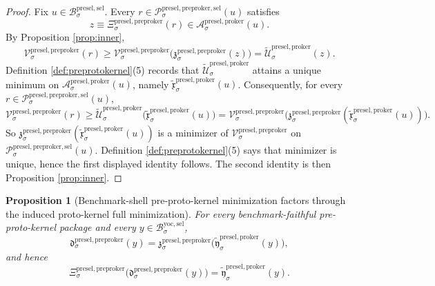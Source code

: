 \documentclass[11pt]{article}
\newcommand{\YoctoSelectorBody}[1]{\mathcal B_{#1}^{\mathrm{yoc,sel}}}
\newcommand{\PreSectionSelectorBody}[1]{\mathcal B_{#1}^{\mathrm{presel,sel}}}
\newcommand{\ProtoKernelSelectorFiber}[2]{\mathcal A_{#1}^{\mathrm{presel,proker}}(#2)}
\newcommand{\PreProtoKernelProj}[1]{\Xi_{#1}^{\mathrm{presel,preproker}}}
\newcommand{\PreProtoKernelFunctional}[1]{\mathscr V_{#1}^{\mathrm{presel,preproker}}}
\newcommand{\PreProtoKernelMinLift}[1]{\mathfrak z_{#1}^{\mathrm{presel,preproker}}}
\newcommand{\PreProtoKernelSelectorFiber}[2]{\mathcal P_{#1}^{\mathrm{presel,preproker,sel}}(#2)}
\newcommand{\PreProtoKernelFullMin}[1]{\mathfrak d_{#1}^{\mathrm{presel,preproker}}}
\newcommand{\InducedProtoKernelFunctional}[1]{\widetilde{\mathscr U}_{#1}^{\mathrm{presel,proker}}}
\newcommand{\InducedProtoKernelSelectorMin}[1]{\widetilde{\mathfrak x}_{#1}^{\mathrm{presel,proker}}}
\newcommand{\InducedProtoKernelFullMin}[1]{\widetilde{\mathfrak y}_{#1}^{\mathrm{presel,proker}}}
\newtheorem{proposition}{Proposition}
\begin{document}
\begin{proof}
Fix \(u\in\PreSectionSelectorBody{\sigma}\). Every \(r\in\PreProtoKernelSelectorFiber{\sigma}{u}\) satisfies
\[
z\equiv\PreProtoKernelProj{\sigma}(r)\in\ProtoKernelSelectorFiber{\sigma}{u}.
\]
By Proposition \ref{prop:inner},
\[
\PreProtoKernelFunctional{\sigma}(r)
\geq
\PreProtoKernelFunctional{\sigma}\bigl(\PreProtoKernelMinLift{\sigma}(z)\bigr)
=
\InducedProtoKernelFunctional{\sigma}(z).
\]
Definition \ref{def:preprotokernel}(5) records that \(\InducedProtoKernelFunctional{\sigma}\) attains a unique minimum on \(\ProtoKernelSelectorFiber{\sigma}{u}\), namely \(\InducedProtoKernelSelectorMin{\sigma}(u)\). Consequently, for every \(r\in\PreProtoKernelSelectorFiber{\sigma}{u}\),
\[
\PreProtoKernelFunctional{\sigma}(r)
\geq
\InducedProtoKernelFunctional{\sigma}\bigl(\InducedProtoKernelSelectorMin{\sigma}(u)\bigr)
=
\PreProtoKernelFunctional{\sigma}\bigl(\PreProtoKernelMinLift{\sigma}(\InducedProtoKernelSelectorMin{\sigma}(u))\bigr).
\]
So \(\PreProtoKernelMinLift{\sigma}(\InducedProtoKernelSelectorMin{\sigma}(u))\) is a minimizer of \(\PreProtoKernelFunctional{\sigma}\) on \(\PreProtoKernelSelectorFiber{\sigma}{u}\). Definition \ref{def:preprotokernel}(5) says that minimizer is unique, hence the first displayed identity follows. The second identity is then Proposition \ref{prop:inner}.
\end{proof}

\begin{proposition}[Benchmark-shell pre-proto-kernel minimization factors through the induced proto-kernel full minimization]
\label{prop:fullfactor}
For every benchmark-faithful pre-proto-kernel package and every \(y\in\YoctoSelectorBody{\sigma}\),
\[
\PreProtoKernelFullMin{\sigma}(y)
=
\PreProtoKernelMinLift{\sigma}\bigl(\InducedProtoKernelFullMin{\sigma}(y)\bigr),
\]
and hence
\[
\PreProtoKernelProj{\sigma}\bigl(\PreProtoKernelFullMin{\sigma}(y)\bigr)
=
\InducedProtoKernelFullMin{\sigma}(y).
\]
\end{proposition}
\end{document}
